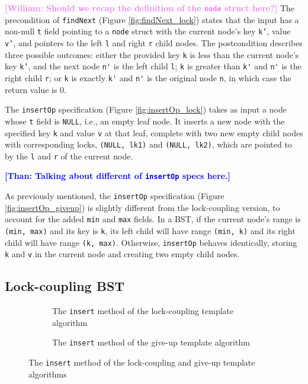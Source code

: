 \documentclass[a4paper,UKenglish,cleveref, autoref, thm-restate]{lipics-v2021}
\newcommand{\than}[1]{\textbf{\textcolor{blue}{[Than: #1]}}}
\newcommand{\wm}[1]{\textbf{\textcolor{violet}{[William: #1]}}}
\begin{document}
\wm{Should we recap the definition of the \lstinline{node} struct here?} The precondition of \texttt{findNext} (Figure \ref*{fig:findNext_lock}) states that the input has a non-null \texttt{t} field pointing to a \texttt{node} struct with the current node's key \texttt{k'}, value \texttt{v'}, and pointers to the left \texttt{l} and right \texttt{r} child nodes. The postcondition describes three possible outcomes: either the provided key \texttt{k} is less than the current node's key \texttt{k'}, and the next node \lstinline{n'} is the left child \lstinline{l}; \lstinline{k} is greater than \lstinline{k'} and \lstinline{n'} is the right child \lstinline{r}; or \lstinline{k} is exactly \lstinline{k'} and \lstinline{n'} is the original node \lstinline{n}, in which case the return value is 0.

The \texttt{insertOp} specification (Figure \ref{fig:insertOp_lock}) takes as input a node whose \lstinline{t} field is \lstinline{NULL}, i.e., an empty leaf node. It inserts a new node with the specified key \texttt{k} and value \texttt{v} at that leaf, complete with two new empty child nodes with corresponding locks, \texttt{(NULL, lk1)} and \texttt{(NULL, lk2)}, which are pointed to by the \texttt{l} and \texttt{r} of the current node.  

\than{Talking about different of \texttt{insertOp} specs here.}


As previously mentioned, the \texttt{insertOp} specification (Figure \ref{fig:insertOp_giveup}) is slightly different from the lock-coupling version, to account for the added \lstinline{min} and \lstinline{max} fields. In a BST, if the current node's range is \lstinline{(min, max)} and its key is \lstinline{k}, its left child will have range \texttt{(min, k)} and its right child will have range \texttt{(k, max)}. Otherwise, \lstinline{insertOp} behaves identically, storing \lstinline{k} and \lstinline{v} in the current node and creating two empty child nodes.


\subsection{Lock-coupling BST}
\begin{figure}[h]
	\begin{subfigure}[t]{0.48\textwidth}
	 
	\caption{The \lstinline{insert} method of the lock-coupling template algorithm}
	\label{insert_lock}	
	\end{subfigure}\qquad
    \begin{subfigure}[t]{0.48\textwidth}
     
    \caption{The \lstinline{insert} method of the give-up template algorithm}
    \label{insert_giveup}
    \end{subfigure} 
\caption{The \lstinline{insert} method of the lock-coupling and give-up template algorithms}
\label{insert_lock_giveup} 
\end{figure}
\end{document}
